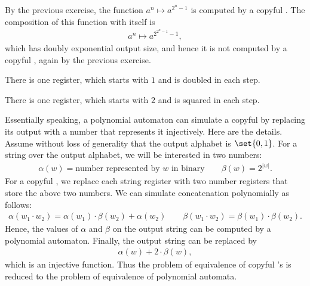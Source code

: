    {
By the previous exercise, the function $a^n \mapsto a^{2^n-1}$ is computed by a copyful \sst. The composition of this function with itself is
\begin{align*}
a^n \mapsto a^{2^{2^n-1}-1},
\end{align*}
which has doubly exponential output size, and hence it is not computed by a copyful \sst, again by the previous exercise.
}

   { There is one register, which starts with $1$ and is doubled in each step. }

     { There is one register, which starts with $2$ and is squared in each step. }


{

Essentially speaking, a polynomial automaton can simulate a copyful \sst by replacing its output with a number that represents it injectively.  Here are the details.
Assume without loss of generality that the output alphabet is $\set{0,1}$. For a string over the output alphabet, we will be interested in two numbers: 
\begin{align*}
\alpha(w) = \text{number represented by $w$ in binary} \qquad \beta(w) = 2^{|w|}.
\end{align*}
For a copyful \sst, we replace each string register with two number registers that store the above two numbers. We can simulate concatenation polynomially as follows: 
\begin{align*}
\alpha(w_1 \cdot w_2) = \alpha(w_1) \cdot \beta(w_2) + \alpha(w_2) \qquad \beta(w_1 \cdot w_2) = \beta(w_1) \cdot \beta(w_2).
\end{align*}
Hence, the values of $\alpha$ and $\beta$ on the output string can be computed by a polynomial automaton. Finally, the output string can be replaced by 
\begin{align*}
\alpha(w) + 2 \cdot \beta(w),
\end{align*}
which is an injective function. Thus the problem of equivalence of copyful \sst's is reduced to the problem of equivalence of polynomial automata.
}